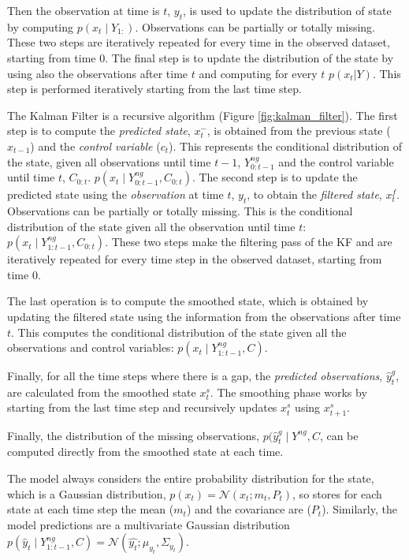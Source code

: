 \documentclass{article}
\newcommand{\norm}[3]{\mathcal{N}\left(#1; #2, #3\right)} %
\begin{document}
Then the observation at time is $t$, $y_t$, is used to update the distribution of state by computing $p(x_t \mid Y_{1:})$. Observations can be partially or totally missing.
These two steps are iteratively repeated for every time in the observed dataset, starting from time $0$.
The final step is to update the distribution of the state by using also the observations after time $t$ and computing for every $t$ $p(x_t|Y)$. This step is performed iteratively starting from the last time step.


The Kalman Filter is a recursive algorithm (Figure \ref{fig:kalman_filter}).
The first step is to compute the \textit{predicted state}, $x^-_t$, is obtained from the previous state ($x_{t-1}$) and the \textit{control variable} ($c_t$). This represents the conditional distribution of the state, given all observations until time $t-1$, $Y^{ng}_{0:t-1}$ and the control variable until time $t$, $C_{0:t}$. $p(x_t \mid Y^{ng}_{0:t-1}, C_{0:t})$.
The second step is to update the predicted state using the \textit{observation} at time $t$, $y_t$, to obtain the \textit{filtered state}, $x^f_t$. Observations can be partially or totally missing. This is the conditional distribution of the state given all the observation until time $t$: $p(x_t \mid Y^{ng}_{1:t-1}, C_{0:t})$.
These two steps make the filtering pass of the KF and are iteratively repeated for every time step in the observed dataset, starting from time $0$.

The last operation is to compute the smoothed state, which is obtained by updating the filtered state using the information from the observations after time $t$. This computes the conditional distribution of the state given all the observations and control variables: $p(x_t \mid Y^{ng}_{1:t-1}, C)$.

Finally, for all the time steps where there is a gap, the \textit{predicted observations}, $\hat{y}^g_t$, are calculated from the smoothed state $x^s_t$. The smoothing phase works by starting from the last time step and recursively updates $x^s_t$ using $x^s_{t+1}$.

Finally, the distribution of the missing observations, $p(\hat{y}^g_t \mid Y^{ng}, C$, can be computed directly from the smoothed state at each time.

The model always considers the entire probability distribution for the state, which is a Gaussian distribution,  $p(x_t) = \norm{x_t}{m_t}{P_t}$, so stores for each state at each time step the mean ($m_t$) and the covariance are ($P_t$). Similarly, the model predictions are a multivariate Gaussian distribution $p(\hat{y}_t \mid Y^{ng}_{1:t-1}, C) =  \norm{\hat{y_t}}{\mu_{y_t}}{\Sigma_{y_t}}$.
\end{document}
